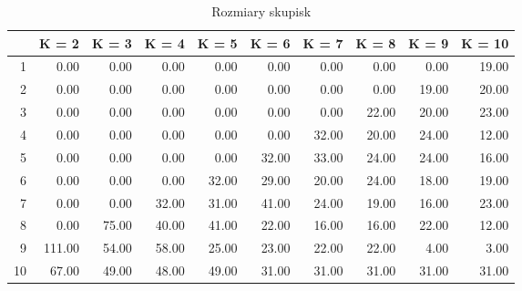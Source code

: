\begin{table}[ht]
\centering
\begin{tabular}{rrrrrrrrrr}
  \hline
 & K = 2 & K = 3 & K = 4 & K = 5 & K = 6 & K = 7 & K = 8 & K = 9 & K = 10 \\ 
  \hline
1 & 0.00 & 0.00 & 0.00 & 0.00 & 0.00 & 0.00 & 0.00 & 0.00 & 19.00 \\ 
  2 & 0.00 & 0.00 & 0.00 & 0.00 & 0.00 & 0.00 & 0.00 & 19.00 & 20.00 \\ 
  3 & 0.00 & 0.00 & 0.00 & 0.00 & 0.00 & 0.00 & 22.00 & 20.00 & 23.00 \\ 
  4 & 0.00 & 0.00 & 0.00 & 0.00 & 0.00 & 32.00 & 20.00 & 24.00 & 12.00 \\ 
  5 & 0.00 & 0.00 & 0.00 & 0.00 & 32.00 & 33.00 & 24.00 & 24.00 & 16.00 \\ 
  6 & 0.00 & 0.00 & 0.00 & 32.00 & 29.00 & 20.00 & 24.00 & 18.00 & 19.00 \\ 
  7 & 0.00 & 0.00 & 32.00 & 31.00 & 41.00 & 24.00 & 19.00 & 16.00 & 23.00 \\ 
  8 & 0.00 & 75.00 & 40.00 & 41.00 & 22.00 & 16.00 & 16.00 & 22.00 & 12.00 \\ 
  9 & 111.00 & 54.00 & 58.00 & 25.00 & 23.00 & 22.00 & 22.00 & 4.00 & 3.00 \\ 
  10 & 67.00 & 49.00 & 48.00 & 49.00 & 31.00 & 31.00 & 31.00 & 31.00 & 31.00 \\ 
   \hline
\end{tabular}
\caption{Rozmiary skupisk} 
\end{table}
